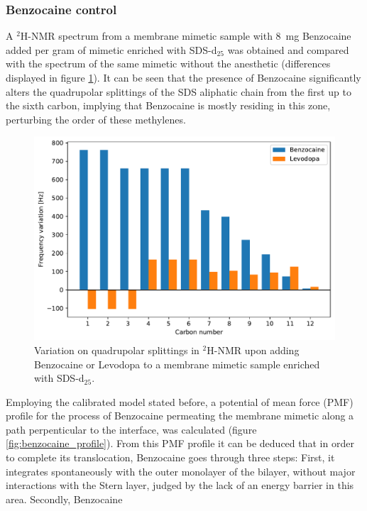 \documentclass[3p,preprint,review]{elsarticle}
\begin{document}
	\subsubsection{Benzocaine control}
	\label{sec:benzo}
	
	A $^2$H-NMR spectrum from a membrane mimetic sample with \SI{8}{mg}
	Benzocaine added per gram of mimetic enriched with SDS-d$_{25}$ was obtained
	and compared
	with the spectrum of the same mimetic without the anesthetic (differences
	displayed in figure
	\ref{fig:sds_benzocaine}). It can be seen that the presence
	of
	Benzocaine significantly alters the quadrupolar splittings of the SDS aliphatic chain 
	from the first up to the sixth carbon, implying that Benzocaine is mostly
	residing in this zone, perturbing the order of these methylenes.
	\begin{figure}[htb]
		\centering
		\includegraphics[width=\columnwidth]{sds_variation}
		\caption{Variation on quadrupolar splittings in $^2$H-NMR upon adding
			Benzocaine or Levodopa to a membrane mimetic sample enriched with
			SDS-d$_{25}$.}
		\label{fig:sds_benzocaine}
	\end{figure}
	Employing the calibrated model stated before, a potential of mean force (PMF)
	profile for the process of Benzocaine permeating the membrane mimetic along a
	path perpenticular to the interface, was calculated
	(figure \ref{fig:benzocaine_profile}). From this PMF profile it can be deduced
	that
	in order to complete its
	translocation, Benzocaine goes through three steps:
	First, it integrates spontaneously with the outer monolayer of the bilayer,
	without major interactions with the Stern layer, judged by the lack of an
	energy barrier in this area. Secondly, Benzocaine
\end{document}
